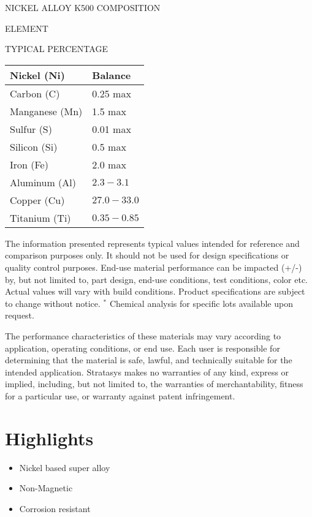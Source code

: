 \documentclass[10pt]{article}
\begin{document}
NICKEL ALLOY K500 COMPOSITION

ELEMENT

TYPICAL PERCENTAGE

\begin{center}
\begin{tabular}{|l|l|}
\hline
Nickel (Ni) & Balance \\
\hline
Carbon (C) & 0.25 max \\
\hline
Manganese (Mn) & 1.5 max \\
\hline
Sulfur (S) & 0.01 max \\
\hline
Silicon (Si) & 0.5 max \\
\hline
Iron (Fe) & 2.0 max \\
\hline
Aluminum (Al) & $2.3-3.1$ \\
\hline
Copper (Cu) & $27.0-33.0$ \\
\hline
Titanium (Ti) & $0.35-0.85$ \\
\hline
\end{tabular}
\end{center}

The information presented represents typical values intended for reference and comparison purposes only. It should not be used for design specifications or quality control purposes. End-use material performance can be impacted (+/-) by, but not limited to, part design, end-use conditions, test conditions, color etc. Actual values will vary with build conditions. Product specifications are subject to change without notice. ${ }^{*}$ Chemical analysis for specific lots available upon request.

The performance characteristics of these materials may vary according to application, operating conditions, or end use. Each user is responsible for determining that the material is safe, lawful, and technically suitable for the intended application. Stratasys makes no warranties of any kind, express or implied, including, but not limited to, the warranties of merchantability, fitness for a particular use, or warranty against patent infringement.

\section*{Highlights}
\begin{itemize}
  \item Nickel based super alloy

  \item Non-Magnetic

  \item Corrosion resistant

\end{itemize}
\end{document}
